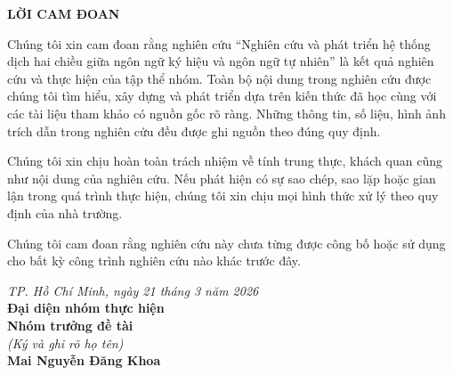\begin{center}
    {\fontsize{14}{17}\selectfont\bfseries LỜI CAM ĐOAN}
\end{center}

\vspace{20pt}
\setlength{\parindent}{1.25cm}
\setlength{\parskip}{0.3em}

Chúng tôi xin cam đoan rằng nghiên cứu ``Nghiên cứu và phát triển hệ thống dịch hai chiều giữa ngôn ngữ ký hiệu và ngôn ngữ tự nhiên'' là kết quả nghiên cứu và thực hiện của tập thể nhóm. Toàn bộ nội dung trong  nghiên cứu được chúng tôi tìm hiểu, xây dựng và phát triển dựa trên kiến thức đã học cùng với các tài liệu tham khảo có nguồn gốc rõ ràng. Những thông tin, số liệu, hình ảnh trích dẫn trong nghiên cứu đều được ghi nguồn theo đúng quy định.

Chúng tôi xin chịu hoàn toàn trách nhiệm về tính trung thực, khách quan cũng như nội dung của nghiên cứu. Nếu phát hiện có sự sao chép, sao lặp hoặc gian lận trong quá trình thực hiện, chúng tôi xin chịu mọi hình thức xử lý theo quy định của nhà trường.

Chúng tôi cam đoan rằng nghiên cứu này chưa từng được công bố hoặc sử dụng cho bất kỳ công trình nghiên cứu nào khác trước đây.

\vspace{1cm}

\begin{flushright}
\textit{TP. Hồ Chí Minh, ngày 21 tháng 3 năm 2026}\\[0.3cm]
\textbf{Đại diện nhóm thực hiện}\\[0.3cm]
\textbf{Nhóm trưởng đề tài}\\[0.3cm]
\textit{(Ký và ghi rõ họ tên)}\\
\vspace{2cm}
\textbf{Mai Nguyễn Đăng Khoa}
\end{flushright}